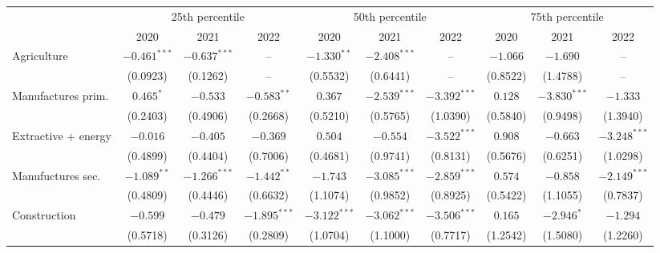 \begin{tabular}{l|ccc|ccc|ccc|}
\toprule
{} & \multicolumn{3}{c}{25th percentile} & \multicolumn{3}{c}{50th percentile} & \multicolumn{3}{c}{75th percentile} \\
{} &            2020 &            2021 &            2022 &            2020 &            2021 &            2022 &            2020 &            2021 &            2022 \\
\midrule
Agriculture              &  $-0.461^{***}$ &  $-0.637^{***}$ &              -- &   $-1.330^{**}$ &  $-2.408^{***}$ &              -- &        $-1.066$ &        $-1.690$ &              -- \\
                         &        (0.0923) &        (0.1262) &              -- &        (0.5532) &        (0.6441) &              -- &        (0.8522) &        (1.4788) &              -- \\
Manufactures prim.       &       $0.465^*$ &        $-0.533$ &   $-0.583^{**}$ &         $0.367$ &  $-2.539^{***}$ &  $-3.392^{***}$ &         $0.128$ &  $-3.830^{***}$ &        $-1.333$ \\
                         &        (0.2403) &        (0.4906) &        (0.2668) &        (0.5210) &        (0.5765) &        (1.0390) &        (0.5840) &        (0.9498) &        (1.3940) \\
Extractive + energy      &        $-0.016$ &        $-0.405$ &        $-0.369$ &         $0.504$ &        $-0.554$ &  $-3.522^{***}$ &         $0.908$ &        $-0.663$ &  $-3.248^{***}$ \\
                         &        (0.4899) &        (0.4404) &        (0.7006) &        (0.4681) &        (0.9741) &        (0.8131) &        (0.5676) &        (0.6251) &        (1.0298) \\
Manufuctures sec.        &   $-1.089^{**}$ &  $-1.266^{***}$ &   $-1.442^{**}$ &        $-1.743$ &  $-3.085^{***}$ &  $-2.859^{***}$ &         $0.574$ &        $-0.858$ &  $-2.149^{***}$ \\
                         &        (0.4809) &        (0.4446) &        (0.6632) &        (1.1074) &        (0.9852) &        (0.8925) &        (0.5422) &        (1.1055) &        (0.7837) \\
Construction             &        $-0.599$ &        $-0.479$ &  $-1.895^{***}$ &  $-3.122^{***}$ &  $-3.062^{***}$ &  $-3.506^{***}$ &         $0.165$ &      $-2.946^*$ &        $-1.294$ \\
                         &        (0.5718) &        (0.3126) &        (0.2809) &        (1.0704) &        (1.1000) &        (0.7717) &        (1.2542) &        (1.5080) &        (1.2260) \\

\end{tabular}

